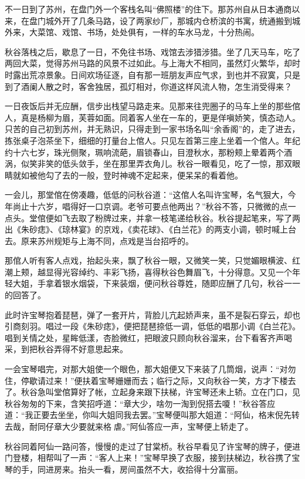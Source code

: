 \documentclass[12pt,UTF8]{ctexbook}
\begin{document}
不一日到了苏州，在盘门外一个客栈名叫“佛照楼”的住下。那苏州自从日本通商以来，在盘门城外开了几条马路，设了两家纱厂，那城内仓桥滨的书寓，统通搬到城外来，大菜馆、戏馆、书场，处处俱有，一样的车水马龙，十分热闹。

秋谷落栈之后，歇息了一日，不免往书场、戏馆去涉猎涉猎。坐了几天马车，吃了两回大菜，觉得苏州马路的风景不过如此。与上海大不相同，虽然灯火繁华，却时时露出荒凉景象。日间欢场征逐，自有那一班朋友声应气求，到也并不寂寞，只是到了酒阑人散之时，客舍独居，孤灯相对，你道这样风流人物，怎生消受得来？

一日夜饭后并无应酬，信步出栈望马路走来。见那来往兜圈子的马车上坐的那些倌人，真是杨柳为眉，芙蓉如面。同着客人坐在一车的，更是佯嗔娇笑，慎态动人。只苦的自己初到苏州，并无熟识，只得走到一家书场名叫“余香阁”的，走了进去，拣张桌子泡茶坐下，细细的打量台上倌人。只见左首第三座上坐着一个倌人。年纪约十六七岁，珠光侧聚，珮响流葩，眉锁春山，目澄秋水，那粉颊上晕着两个酒涡，似笑非笑的低头敛手，坐在那里弄衣角儿。秋谷一眼看见，吃了一惊，那双眼睛就如被他勾了去的一般，登时神魂不定起来，便呆呆的看着他。

一会儿，那堂倌在傍凑趣，低低的问秋谷道：“这倌人名叫许宝琴，名气狠大，今年尚止十六岁，唱得好一口京调。老爷可要点他两出？”秋谷不答，只微微的点一点头。堂倌便如飞去取了粉牌过来，并拿一枝笔递给秋谷。秋谷提起笔来，写了两出《朱砂痣》、《琼林宴》的京戏，《卖花球》、《白兰花》的两支小调，顿时喊上台去。原来苏州规矩与上海不同，点戏是当台招呼的。

那倌人听有客人点戏，抬起头来，飘了秋谷一眼，又微笑一笑，只觉媚眼横波、红潮上颊，越显得光容绰约、丰彩飞扬，喜得秋谷色舞眉飞，十分得意。又见一个年轻大姐，手拿着银水烟袋，下来装烟，便问秋谷尊姓，随即应酬了几句，秋谷一一的回答了。

此时许宝琴抱着琵琶，弹了一套开片，背脸儿亢起娇声来，虽不是裂石穿云，却也引商刻羽。唱过一段《朱砂痣》，便把琵琶捺低一调，低低的唱那小调《白兰花》。唱到关情之处，星眸低漾，杏脸微红，把眼波只顾向秋谷溜来，台下看客齐声喝采，到把秋谷弄得不好意思起来。

一会宝琴唱完，对那大姐使一个眼色，那大姐便又下来装了几筒烟，说声：“对勿住，停歇请过来！”便扶着宝琴姗姗而去；临行之际，又向秋谷一笑，方才下楼去了。秋谷急叫堂倌算好了帐，立起身来跟下扶梯，许宝琴还未上轿。立在门口，见秋谷匆匆的下来，含笑招呼道：“章大少，啥勿一淘到倪搭去嗄！”秋谷答应道：“我正要去坐坐，你叫大姐同我去罢。”宝琴便叫那大姐道：“阿仙，格末倪先转去哉，耐同仔章大少要就来格虐。”阿仙答应一声，宝琴便上轿走了。

秋谷同着阿仙一路问答，慢慢的走过了甘棠桥。秋谷早看见了许宝琴的牌子，便进门登楼，相帮叫了一声：“客人上来！”宝琴早换了衣服，接到扶梯边，秋谷携了宝琴的手，同进房来。抬头一看，房间虽然不大，收拾得十分富丽。
\end{document}
